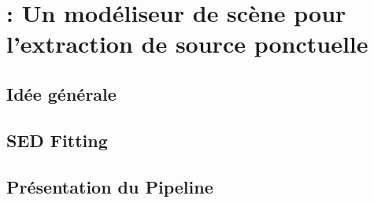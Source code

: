 \documentclass[../main/main.tex]{subfiles}
\begin{document}
\chapter{\hypergal : Un modéliseur de scène pour l'extraction de source ponctuelle}\label{ch:hypergal}

\minitoc
\newpage

\section{Idée générale}

\section{SED Fitting}

\section{Présentation du Pipeline}
\end{document}
